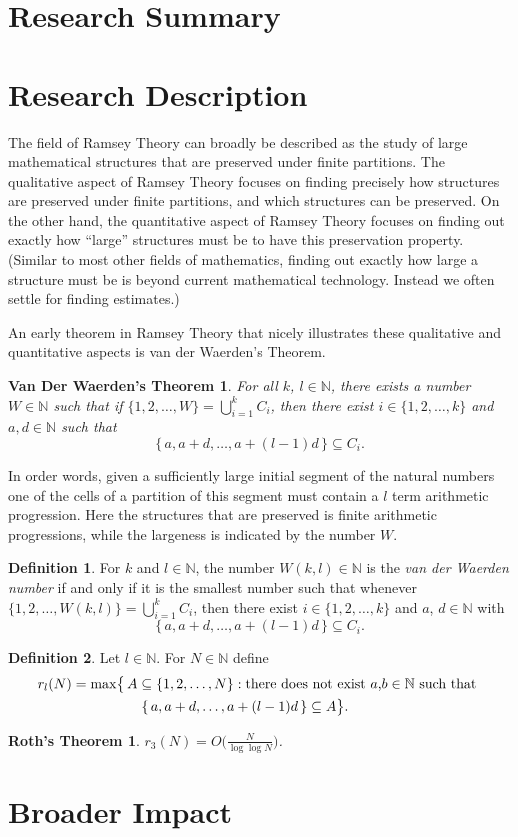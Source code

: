 \documentclass[12pt]{article}
\theoremstyle{plain}
\newtheorem*{vdw}{Van Der Waerden's Theorem}
\newtheorem*{roth}{Roth's Theorem}
\theoremstyle{definition}
\newtheorem*{defn}{Definition}
\newcommand{\bbN}{\mathbb{N}}
\begin{document}
\section{Research Summary}

\section{Research Description}
The field of Ramsey Theory can broadly be described as the study of
large mathematical structures that are preserved under finite
partitions. 
The qualitative aspect of Ramsey Theory focuses on finding precisely
how structures are preserved under finite partitions, and which
structures can be preserved. 
On the other hand, the quantitative aspect of Ramsey Theory focuses on
finding out exactly how ``large'' structures must be to have this
preservation property. 
(Similar to most other fields of mathematics, finding out exactly how
large a structure must be is beyond current mathematical technology. 
Instead we often settle for finding estimates.)

An early theorem in Ramsey Theory that nicely illustrates these
qualitative and quantitative aspects is van der Waerden's Theorem.

  \begin{vdw}
    For all $k$, $l \in \bbN$, there exists a number $W \in \bbN$ such
    that if $\{1, 2, \ldots, W \} = \bigcup_{i=1}^k C_i$, then there
    exist $i \in \{1, 2, \ldots, k\}$ and $a, d \in \bbN$ such that
    \[
      \{\, a, a+d, \ldots, a+(l-1)d \,\} \subseteq C_i.
    \]
  \end{vdw}

In order words, given a sufficiently large initial segment of the
natural numbers one of the cells of a partition of this segment must
contain a $l$ term arithmetic progression. 
Here the structures that are preserved is finite arithmetic
progressions, while the largeness is indicated by the number $W$.

  \begin{defn}
    For $k$ and $l \in \bbN$,
    the number $W(k,l) \in \bbN$ is the \textsl{van der Waerden
      number} if and only if it is the smallest number such that whenever
    $\{1, 2, \ldots, W(k,l)\} = \bigcup_{i=1}^k C_i$, then there
    exist $i \in \{1, 2, \ldots, k\}$ and $a$, $d \in \bbN$ with 
    \[
      \{\, a, a+d, \ldots, a+(l-1)d \,\} \subseteq C_i.
    \]
  \end{defn}

  \begin{defn}
    Let $l \in \bbN$. 
    For $N \in \bbN$ define 
      \begin{align*}
        r_l(N) &= \max\bigr\{\, A \subseteq \{1, 2, \ldots, N\} : 
          \hbox{there does not exist $a$,$b \in \bbN$ such that } \\
          &\hspace{5em}\hbox{$\{\,a, a+d, \ldots, a+(l-1)d \,\}
            \subseteq A$} \bigl\}.
      \end{align*}
  \end{defn}

  \begin{roth}
    $r_3(N) = O\bigl(\frac{N}{\log\log N}\bigl)$.
  \end{roth}
\section{Broader Impact}



\end{document}

